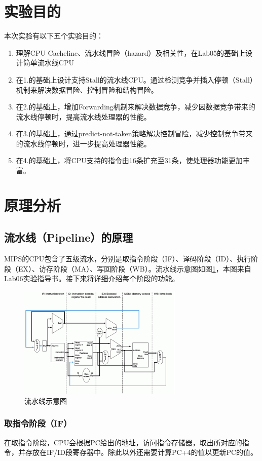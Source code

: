\section{实验目的}
本次实验有以下五个实验目的：
\begin{enumerate}
    \item 理解CPU Cacheline、流水线冒险（hazard）及相关性，在Lab05的基础上设计简单流水线CPU
    \item 在1.的基础上设计支持Stall的流水线CPU。通过检测竞争并插入停顿（Stall）机制来解决数据冒险、控制冒险和结构冒险。
    \item 在2.的基础上，增加Forwarding机制来解决数据竞争，减少因数据竞争带来的流水线停顿时，提高流水线处理器的性能。
    \item 在3.的基础上，通过predict-not-taken策略解决控制冒险，减少控制竞争带来的流水线停顿时，进一步提高处理器性能。
    \item 在4.的基础上，将CPU支持的指令由16条扩充至31条，使处理器功能更加丰富。
\end{enumerate}

\section{原理分析}
\subsection{流水线（Pipeline）的原理}
MIPS的CPU包含了五级流水，分别是取指令阶段（IF）、译码阶段（ID）、执行阶段（EX）、访存阶段（MA）、写回阶段（WB）。流水线示意图如图\ref{fig:pipeline}，本图来自Lab06实验指导书。接下来将详细介绍每个阶段的功能。
\begin{figure}[!h]
    \centering
    \includegraphics[width=0.7\textwidth]{./pipeline.png}
    \caption{流水线示意图}
    \label{fig:pipeline}
\end{figure}

\subsubsection{取指令阶段（IF）}
在取指令阶段，CPU会根据PC给出的地址，访问指令存储器，取出所对应的指令，并存放在IF/ID段寄存器中。除此以外还需要计算PC+4的值以更新PC的值。

